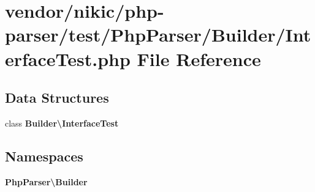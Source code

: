 \section{vendor/nikic/php-\/parser/test/\+Php\+Parser/\+Builder/\+Interface\+Test.php File Reference}
\label{nikic_2php-parser_2test_2_php_parser_2_builder_2_interface_test_8php}
\subsection*{Data Structures}
\begin{DoxyCompactItemize}
\item 
class {\bf Builder\textbackslash{}\+Interface\+Test}
\end{DoxyCompactItemize}
\subsection*{Namespaces}
\begin{DoxyCompactItemize}
\item 
 {\bf Php\+Parser\textbackslash{}\+Builder}
\end{DoxyCompactItemize}
